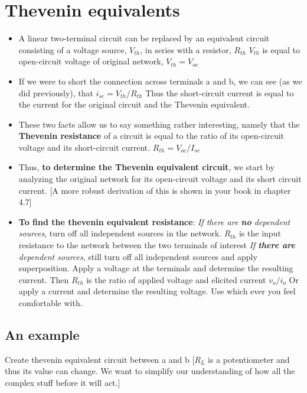 \documentclass[11pt]{book}
\begin{document}
\section{Thevenin equivalents}
\begin{itemize}
	\item A linear two-terminal circuit can be replaced by an equivalent circuit consisting of a voltage source, $V_{th}$, in series with a resistor, $R_{th}$
	\subitem $V_{th}$ is equal to open-circuit voltage of original network, $V_{th} = V_{oc}$
	\item If we were to short the connection across terminals a and b, we can see (as we did previously), that $i_{sc} = V_{th}/R_{th}$
	\subitem Thus the short-circuit current is equal to the current for the original circuit and the Thevenin equivalent.
	\item These two facts allow us to say something rather interesting, namely that the \textbf{Thevenin resistance} of a circuit is equal to the ratio of its open-circuit voltage and its short-circuit current. $R_{th} = V_{oc}/I_{sc}$
	\item Thus, \textbf{to determine the Thevenin equivalent circuit}, we start by analyzing the original network for its open-circuit voltage and its short circuit current. [A more robust derivation of this is shown in your book in chapter 4.7]
	\item \textbf{To find the thevenin equivalent resistance}:
	\subitem \textit{If there are \textbf{no} dependent sources}, turn off all independent sources in the network. $R_{th}$ is the input resistance to the network between the two terminals of interest
	\subitem \textit{If \textbf{there are} dependent sources}, still turn off all independent sources and apply superposition.
	\subsubitem Apply a voltage at the terminals and determine the resulting current. Then $R_{th}$ is the ratio of applied voltage and elicited current $v_o/i_o$
	\subsubitem Or apply a current and determine the resulting voltage. Use which ever you feel comfortable with.
\end{itemize}
\newpage

\subsection{An example}
Create thevenin equivalent circuit between a and b [$R_L$ is a potentiometer and thus its value can change. We want to simplify our understanding of how all the complex stuff before it will act.]
\end{document}
